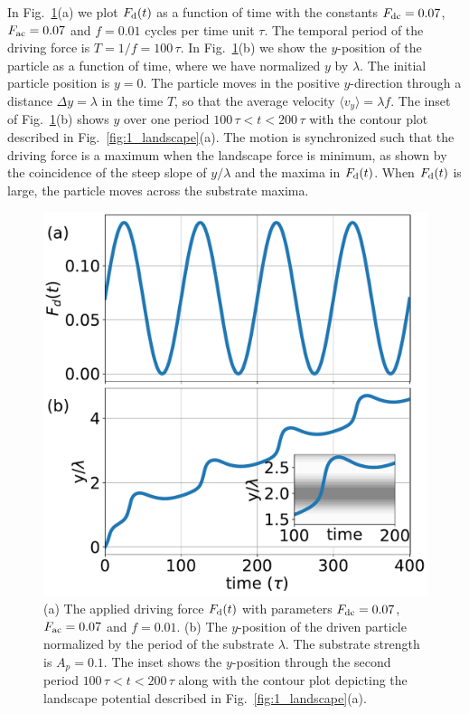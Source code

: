 \documentclass[preprint,showpacs,preprintnumbers,amsmath,amssymb,aps,prb]{revtex4-1}
\theoremstyle{remark}
\begin{document}
In Fig.~\ref{fig:2_Fd_vy_time}(a)
we plot $F_{\rm d}(t)$ 
as a function of time with the
constants $F_{\rm dc}=0.07$, 
$F_{\rm ac}=0.07$ and $f=0.01$ cycles per time unit $\tau$.
The  temporal period of the driving force is
$T = 1/f = 100\,\tau$.
In Fig.~\ref{fig:2_Fd_vy_time}(b) 
we show the $y$-position of the particle
as a function of time,
where we have
normalized $y$ by $\lambda$.
The initial particle position is $y = 0$. 
The particle moves
in the positive $y$-direction
through a distance $\Delta y = \lambda$  in the time $T$,
so that  
the average velocity 
$\langle {v}_y \rangle = \lambda f$. 
The inset of Fig.~\ref{fig:2_Fd_vy_time}(b)
shows $y$ 
over one period $100\,\tau < t < 200\,\tau$
with 
the contour plot described
in Fig.~\ref{fig:1_landscape}(a).
The motion is synchronized such that the 
driving force is a maximum when the landscape 
force is minimum,
as shown by the coincidence of the
steep slope of 
$y/\lambda$ 
and the maxima in $F_{\rm d}(t)$.
When $F_{\rm d}(t)$ is large,
the particle moves across the substrate maxima.

\begin{figure}[h]
\centering
\includegraphics[width=\columnwidth]{fig2_Fd_vy_time.pdf}
\caption{(a) The applied driving force $F_{\rm d}(t)$ 
  with parameters $F_{\rm dc} = 0.07$, $F_{\rm ac} = 0.07$ and $f=0.01$.
  (b) 
  The $y$-position of the driven particle
  normalized by the period of the substrate $\lambda$.
  The substrate strength is $A_p=0.1$.
  The inset   shows
  the $y$-position
  through the second period $100\,\tau<t<200\,\tau$
 along with the contour plot depicting
  the landscape potential described in Fig.~\ref{fig:1_landscape}(a).
  }
\label{fig:2_Fd_vy_time}
\end{figure}
\end{document}
